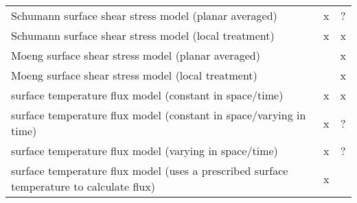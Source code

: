 \documentclass{article}
\begin{document}
\begin{center}
\begin{tabular}{ l | c | c }
\midrule
Schumann surface shear stress model (planar averaged)  &  x  &  ?  \\
Schumann surface shear stress model (local treatment)  &  x  &  x  \\
Moeng surface shear stress model (planar averaged) &   & x  \\
Moeng surface shear stress model (local treatment) &   & x  \\
surface temperature flux model (constant in space/time) & x & x \\
surface temperature flux model (constant in space/varying in time) & x & ? \\
surface temperature flux model (varying in space/time) & x & ? \\
surface temperature flux model (uses a prescribed surface temperature to calculate flux) & x &   \\



\bottomrule
\end{tabular}
\end{center}
\end{document}

